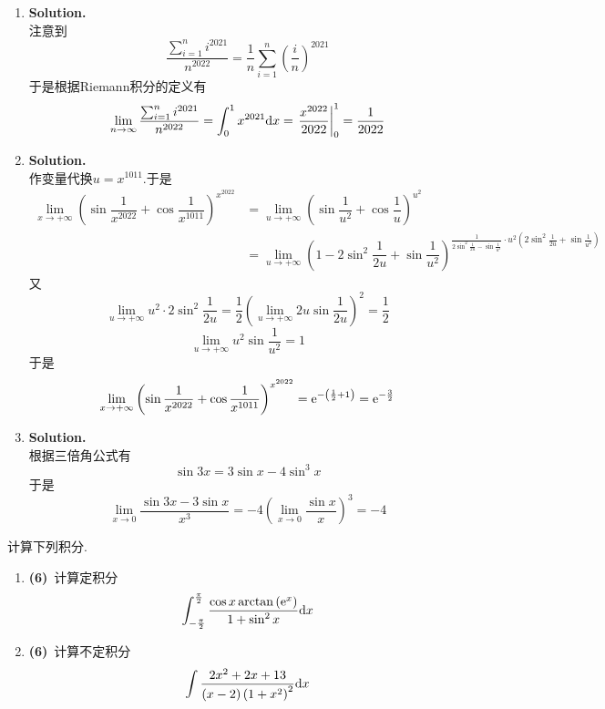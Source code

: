 \documentclass{ctexart}
\begin{document}
\begin{solution}
    \begin{enumerate}[label=\textbf{(\arabic*)}]
        \item \textbf{Solution.}\\
            注意到$$\dfrac{\sum_{i=1}^{n}i^{2021}}{n^{2022}}=\dfrac{1}{n}\sum_{i=1}^{n}\left(\dfrac{i}{n}\right)^{2021}$$
            于是根据Riemann积分的定义有
            $$\lim_{n\to\infty}\dfrac{\sum_{i=1}^{n}i^{2021}}{n^{2022}}=\int_{0}^{1}x^{2021}\mathrm{d} x=\left.\dfrac{x^{2022}}{2022}\right|_0^1=\dfrac{1}{2022}$$
        \item \textbf{Solution.}\\
            作变量代换$u=x^{1011}$.于是
            $$\begin{aligned}
                \lim_{x\to+\infty}\left(\sin\dfrac{1}{x^{2022}}+\cos\dfrac{1}{x^{1011}}\right)^{x^{2022}}
                &= \lim_{u\to+\infty}\left(\sin\dfrac{1}{u^2}+\cos\dfrac{1}{u}\right)^{u^2} \\
                &= \lim_{u\to+\infty}\left(1-2\sin^2\dfrac{1}{2u}+\sin\dfrac{1}{u^2}\right)^{\frac{1}{2\sin^2\frac{1}{2u}-\sin\frac{1}{u^2}}\cdot u^2\left(2\sin^2\frac{1}{2u}+\sin\frac{1}{u^2}\right)}
            \end{aligned}$$
            又$$\lim_{u\to+\infty}u^2\cdot2\sin^2\dfrac{1}{2u}=\dfrac{1}{2}\left(\lim_{u\to+\infty}2u\sin\dfrac{1}{2u}\right)^2=\dfrac{1}{2}$$
            $$\lim_{u\to+\infty}u^2\sin\dfrac{1}{u^2}=1$$
            于是$$\lim_{x\to+\infty}\left(\sin\dfrac{1}{x^{2022}}+\cos\dfrac{1}{x^{1011}}\right)^{x^{2022}}=\mathrm{e}^{-\left(\frac{1}{2}+1\right)}=\mathrm{e}^{-\frac{3}{2}}$$
        \item \textbf{Solution.}\\
            根据三倍角公式有$$\sin3x=3\sin x-4\sin^3x$$
            于是$$\lim_{x\to0}\dfrac{\sin3x-3\sin x}{x^3}=-4\left(\lim_{x\to0}\dfrac{\sin x}{x}\right)^3=-4$$
    \end{enumerate}
\end{solution}
\begin{problem}[3.(12\songti{分})]
    计算下列积分.
    \begin{enumerate}[label=\textbf{(\arabic*)}]
        \item \textbf{(6)}\ 计算定积分$$\int_{-\frac{\pi}{2}}^{\frac{\pi}{2}}\dfrac{\cos x\arctan\left(\mathrm{e}^x\right)}{1+\sin^2x}\mathrm{d} x$$
        \item \textbf{(6)}\ 计算不定积分$$\int\dfrac{2x^2+2x+13}{(x-2)\left(1+x^2\right)^2}\mathrm{d} x$$
    \end{enumerate}
\end{problem}
\end{document}
